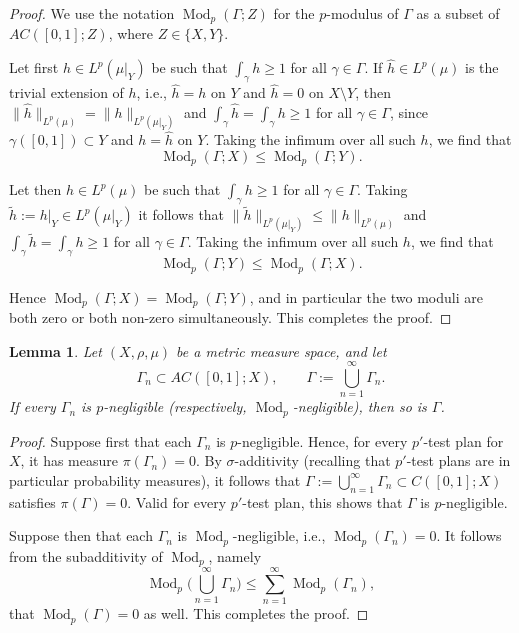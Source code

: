 \documentclass[11pt]{amsart}
\newtheorem{lemma}[theorem]{Lemma}
\theoremstyle{definition}
\theoremstyle{remark}
\numberwithin{equation}{section}
\newcommand{\Norm}[2]{\|#1\|_{#2}}
\begin{document}
\begin{proof}
We use the notation $\operatorname{Mod}_p(\Gamma;Z)$ for
the $p$-modulus of $\Gamma$ as a subset of $AC([0,1];Z)$,
where $Z\in\{X,Y\}$.

Let first $h\in L^p(\mu|_Y)$ be such that $\int_\gamma h\geq 1$ for all $\gamma\in\Gamma$.
If $\hat h\in L^p(\mu)$ is the trivial extension of $h$, i.e., $\hat h=h$ on $Y$ and $\hat
h=0$ on $X\setminus Y$,
then $\Norm{\hat h}{L^p(\mu)}=\Norm{h}{L^p(\mu|_Y)}$ and $\int_\gamma \hat h=\int_\gamma
h\geq 1$ for all $\gamma\in\Gamma$, since $\gamma([0,1])\subset Y$ and $h=\hat h$ on $Y$.
Taking the infimum over all such $h$, we find that
$$\operatorname{Mod}_p(\Gamma;X)\leq\operatorname{Mod}_p(\Gamma;Y).$$

Let then $h\in L^p(\mu)$ be such that $\int_\gamma h\geq 1$ for all $\gamma\in\Gamma$.
Taking $\tilde h:=h|_Y\in L^p(\mu|_Y)$ it follows that $\Norm{\tilde
h}{L^p(\mu|_Y)}\leq\Norm{h}{L^p(\mu)}$ and $\int_\gamma \tilde h=\int_\gamma h\geq 1$ for
all $\gamma\in\Gamma$. Taking the infimum over all such $h$, we find that
$$\operatorname{Mod}_p(\Gamma;Y)\leq\operatorname{Mod}_p(\Gamma;X).$$

Hence $\operatorname{Mod}_p(\Gamma;X)=\operatorname{Mod}_p(\Gamma;Y)$, and in particular the
two moduli are both zero or both non-zero simultaneously. This completes the proof.
\end{proof}

\begin{lemma}\label{lem:subadditive}
Let $(X,\rho,\mu)$ be a metric measure space, and let
\begin{equation*}
   \Gamma_n\subset AC([0,1];X),\qquad
   \Gamma:=\bigcup_{n=1}^\infty\Gamma_n.
\end{equation*}
If every $\Gamma_n$ is $p$-negligible (respectively, $\operatorname{Mod}_p$-negligible),
then so is $\Gamma$.
\end{lemma}

\begin{proof}
Suppose first that each $\Gamma_n$ is $p$-negligible. Hence, for every $p'$-test plan for
$X$, it has measure $\pi(\Gamma_n)=0$.  By $\sigma$-additivity (recalling that $p'$-test
plans are in particular probability measures), it follows that
$\Gamma:=\bigcup_{n=1}^\infty\Gamma_n\subset C([0,1];X)$ satisfies $\pi(\Gamma)=0$. Valid
for every $p'$-test plan, this shows that $\Gamma$ is $p$-negligible.

Suppose then that each $\Gamma_n$ is $\operatorname{Mod}_p$-negligible, i.e.,
$\operatorname{Mod}_p(\Gamma_n)=0$. It follows from the subadditivity of
$\operatorname{Mod}_p$, namely \cite[(5.2.6)]{HKST:book}
\begin{equation*}
  \operatorname{Mod}_p\Big(\bigcup_{n=1}^\infty\Gamma_n\Big)
  \leq\sum_{n=1}^\infty\operatorname{Mod}_p(\Gamma_n),
\end{equation*}
that $\operatorname{Mod}_p(\Gamma)=0$ as well. This completes the proof.
\end{proof}
\end{document}

